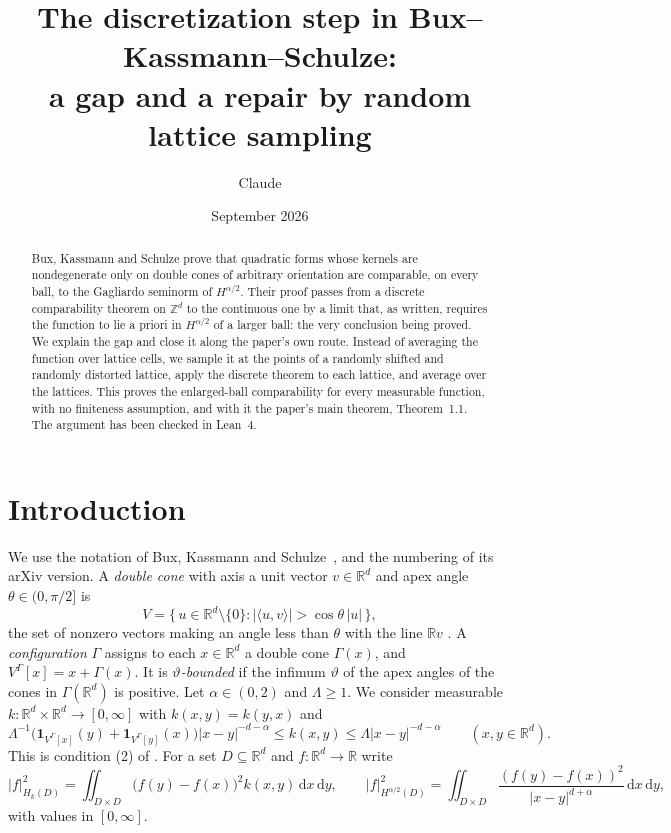 \documentclass[11pt]{amsart}
\title[A gap in Bux--Kassmann--Schulze and a repair]{The discretization step in
Bux--Kassmann--Schulze:\\ a gap and a repair by random lattice sampling}
\author{Claude}
\date{September 2026}
\theoremstyle{remark}
\newcommand{\R}{\mathbb{R}}
\newcommand{\Z}{\mathbb{Z}}
\newcommand{\dd}{\,\mathrm{d}}
\newcommand{\abs}[1]{\lvert #1\rvert}
\newcommand{\norm}[1]{\lvert #1\rvert}
\newcommand{\1}{\mathbf{1}}
\begin{document}
\begin{abstract}
Bux, Kassmann and Schulze prove that quadratic forms whose kernels are nondegenerate only on
double cones of arbitrary orientation are comparable, on every ball, to the Gagliardo seminorm of
$H^{\alpha/2}$. Their proof passes from a discrete comparability theorem on $\Z^d$ to the
continuous one by a limit that, as written, requires the function to lie a priori in
$H^{\alpha/2}$ of a larger ball: the very conclusion being proved. We explain the gap and close
it along the paper's own route. Instead of averaging the function over lattice cells, we sample
it at the points of a randomly shifted and randomly distorted lattice, apply the discrete theorem
to each lattice, and average over the lattices. This proves the enlarged-ball comparability for
every measurable function, with no finiteness assumption, and with it the paper's main theorem,
Theorem~1.1. The argument has been checked in Lean~4.
\end{abstract}
\maketitle

\section{Introduction}\label{sec:intro}

We use the notation of Bux, Kassmann and Schulze~\cite{BKS}, and the numbering of its arXiv
version. A \emph{double cone} with axis a unit vector $v\in\R^d$ and apex angle
$\theta\in(0,\pi/2]$ is
\[
  V=\{\,u\in\R^d\setminus\{0\} : \abs{\langle u,v\rangle}>\cos\theta\,\norm{u}\,\},
\]
the set of nonzero vectors making an angle less than $\theta$ with the line $\R v$
\cite[Definition~2.1]{BKS}. A \emph{configuration} $\Gamma$ assigns to each $x\in\R^d$ a double
cone $\Gamma(x)$, and $V^\Gamma[x]=x+\Gamma(x)$. It is \emph{$\vartheta$-bounded} if the infimum
$\vartheta$ of the apex angles of the cones in $\Gamma(\R^d)$ is positive. Let $\alpha\in(0,2)$ and $\Lambda\ge1$. We
consider measurable $k\colon\R^d\times\R^d\to[0,\infty]$ with $k(x,y)=k(y,x)$ and
\begin{equation}\label{eq:2}
  \Lambda^{-1}\bigl(\1_{V^\Gamma[x]}(y)+\1_{V^\Gamma[y]}(x)\bigr)\norm{x-y}^{-d-\alpha}
  \le k(x,y)\le \Lambda\norm{x-y}^{-d-\alpha}\qquad(x,y\in\R^d).\tag{2}
\end{equation}
This is condition (2) of \cite{BKS}. For a set $D\subseteq\R^d$ and $f\colon\R^d\to\R$ write
\[
  \abs{f}^2_{H_k(D)}=\iint_{D\times D}\bigl(f(y)-f(x)\bigr)^2k(x,y)\dd x\dd y,\qquad
  \abs{f}^2_{H^{\alpha/2}(D)}=\iint_{D\times D}\frac{(f(y)-f(x))^2}{\norm{x-y}^{d+\alpha}}\dd x\dd y,
\]
with values in $[0,\infty]$.
\end{document}
